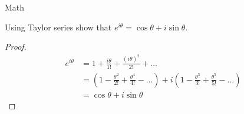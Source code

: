 \documentclass[10pt]{beamer}
\begin{document}
\begin{frame}{Math}
    \begin{theorem}
        Using Taylor series show that $e^{i\theta} = \cos\theta + i \sin\theta$.
    \end{theorem}
    \begin{proof}
        \begin{align*}
            e^{i\theta} &= 1 + \frac{i\theta}{1!} + \frac{(i\theta)^2}{2!} + \ldots \\
            &= (1 - \frac{\theta^2}{2!} + \frac{\theta^4}{4!} - \ldots) + i (1 - \frac{\theta^3}{3!} + \frac{\theta^5}{5!} - \ldots) \\
            &= \cos\theta + i \sin\theta
        \end{align*}
    \end{proof}
\end{frame}
\end{document}
